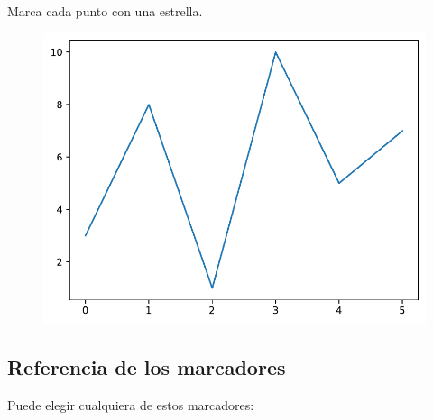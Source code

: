 \begin{code} Marca cada punto con una estrella.

\begin{Shaded}
\begin{Highlighting}[]

\OperatorTok{=}\NormalTok{ np.array([}\NormalTok{, }\NormalTok{, }\NormalTok{, }\NormalTok{])}

\OperatorTok{=} \StringTok{\textquotesingle{}*\textquotesingle{}}\NormalTok{)}
\end{Highlighting}
\end{Shaded}

\begin{figure}
  \centering
  \includegraphics[scale=0.6]{img/grafica1005.pdf}
\end{figure}
\end{code}

\subsection{Referencia de los marcadores}

Puede elegir cualquiera de estos marcadores:


